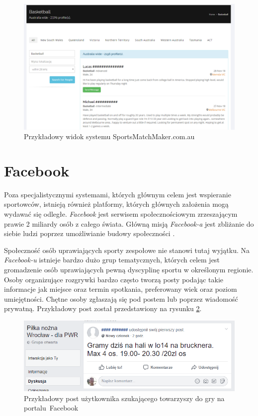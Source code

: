 \begin{figure}[H]
\centering
\includegraphics[width=\linewidth]{02-istniejace-rozwiazania/rys/ss-austr.PNG}
\caption{Przykładowy widok systemu SportsMatchMaker.com.au}
\label{fig:ss-austr}
\end{figure}



\section{Facebook}

Poza specjalistycznymi systemami, których głównym celem jest wspieranie sportowców, istnieją również platformy, których głównych założenia mogą wydawać się odległe. \textit{Facebook} jest serwisem społecznościowym zrzeszającym prawie 2 miliardy osób z całego świata. Główną misją \textit{Facebook-a} jest zbliżanie do siebie ludzi poprzez umożliwianie budowy społeczności \cite{fb}.

Społeczność osób uprawiających sporty zespołowe nie stanowi tutaj wyjątku. Na \textit{Facebook-u} istnieje bardzo dużo grup tematycznych, których celem jest gromadzenie osób uprawiających pewną dyscyplinę sportu w określonym regionie. Osoby organizujące rozgrywki bardzo często tworzą posty podając takie informacje jak miejsce oraz termin spotkania, preferowany wiek oraz poziom umiejętności. Chętne osoby zgłaszają się pod postem lub poprzez wiadomość prywatną. Przykładowy post został przedstawiony na rysunku \ref{fig:ss-fb}.

\begin{figure}[H]
\centering
\includegraphics[width=0.6\linewidth]{02-istniejace-rozwiazania/rys/ss-fb.PNG}
\caption{Przykładowy post użytkownika szukającego towarzyszy do gry na portalu~Facebook}
\label{fig:ss-fb}
\end{figure}



